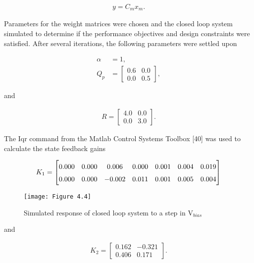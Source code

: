\begin{align}
	y = C_{m}x_{m}.
\end{align}

\noindent Parameters for the weight matrices were chosen and the closed loop system simulated to determine if the performance objectives and design constraints were satisfied. After several iterations, the following parameters were settled upon

\begin{align}
	\alpha &= 1,\\
	Q_{p} &= \begin{bmatrix}
		0.6 & 0.0 \\ 0.0 & 0.5 
	\end{bmatrix},
\end{align}

\noindent and

\begin{align}
	R = \begin{bmatrix}
		4.0 & 0.0 \\ 0.0 & 3.0 
	\end{bmatrix}.
\end{align}

\noindent The Iqr command from the Matlab Control Systems Toolbox [40] was used to calculate the state feedback gains

\begin{align}
	\renewcommand\arraystretch{1.5}
	K_{1} = \begin{bmatrix}
		0.000 & 0.000 & 0.006 & 0.000 & 0.001 & 0.004 & 0.019 \\ 0.000 & 0.000 & -0.002 & 0.011 & 0.001 & 0.005 & 0.004
	\end{bmatrix}
\end{align}

\begin{figure}[H]
	\centering
	\texttt{[image: Figure 4.4]}
	\bf\caption{ Simulated response of closed loop system to a step in $\text{V}_{bias}$}
	\label{fig:4.4}
\end{figure}

\noindent and

\begin{align}
	K_{2} = \begin{bmatrix}
		0.162 & -0.321 \\ 0.406 & 0.171
	\end{bmatrix}.
\end{align}

